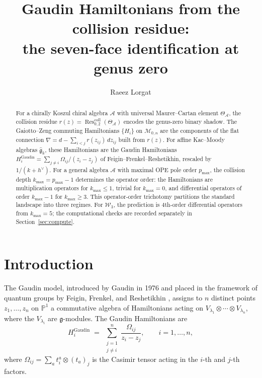 \documentclass[11pt]{article}
\title{Gaudin Hamiltonians from the collision residue:\\
the seven-face identification at genus zero}
\author{Raeez Lorgat}
\date{}
\theoremstyle{plain}
\theoremstyle{definition}
\theoremstyle{remark}
\newcommand{\fg}{\mathfrak{g}}
\newcommand{\cA}{\mathcal{A}}
\newcommand{\cW}{\mathcal{W}}
\newcommand{\Res}{\operatorname{Res}}
\numberwithin{equation}{section}
\begin{document}
\maketitle


\begin{abstract}
For a chirally Koszul chiral algebra $\cA$ with universal
Maurer--Cartan element $\Theta_\cA$, the collision residue
$r(z) = \Res^{\mathrm{coll}}_{0,2}(\Theta_\cA)$ encodes the
genus-zero binary shadow. The Gaiotto--Zeng commuting Hamiltonians
$\{H_i\}$ on $\mathcal{M}_{0,n}$ are the components of the flat
connection $\nabla = d - \sum_{i<j} r(z_{ij}) \, dz_{ij}$ built from
$r(z)$. For affine Kac--Moody algebras $\widehat{\fg}_k$, these
Hamiltonians are the Gaudin Hamiltonians
$H_i^{\mathrm{Gaudin}} = \sum_{j \neq i} \Omega_{ij}/(z_i - z_j)$
of Feigin--Frenkel--Reshetikhin, rescaled by $1/(k+h^\vee)$. For
a general algebra $\cA$ with maximal OPE pole order $p_{\max}$,
the collision depth $k_{\max} = p_{\max} - 1$ determines the
operator order: the Hamiltonians are multiplication operators for
$k_{\max} \leq 1$, trivial for $k_{\max} = 0$, and differential
operators of order $k_{\max} - 1$ for $k_{\max} \geq 3$. This
operator-order trichotomy partitions the standard landscape into
three regimes. For $\cW_3$, the prediction is $4$th-order
differential operators from \(k_{\max}=5\); the computational checks
are recorded separately in Section~\ref{sec:compute}.
\end{abstract}

\section{Introduction}\label{sec:intro}

The Gaudin model, introduced by Gaudin in 1976 and placed in the
framework of quantum groups by Feigin, Frenkel, and Reshetikhin
\cite{FFR1994}, assigns to $n$ distinct points $z_1, \ldots, z_n$ on
$\mathbb{P}^1$ a commutative algebra of Hamiltonians acting on
$V_{\lambda_1} \otimes \cdots \otimes V_{\lambda_n}$, where the
$V_{\lambda_i}$ are $\fg$-modules. The Gaudin Hamiltonians are
\begin{equation}\label{eq:gaudin-hamiltonians}
 H_i^{\mathrm{Gaudin}}
 \;=\;
 \sum_{\substack{j=1 \\ j \neq i}}^n
 \frac{\Omega_{ij}}{z_i - z_j},
 \qquad i = 1, \ldots, n,
\end{equation}
where $\Omega_{ij} = \sum_a t^a_i \otimes (t_a)_j$ is the Casimir
tensor acting in the $i$-th and $j$-th factors.
\end{document}
